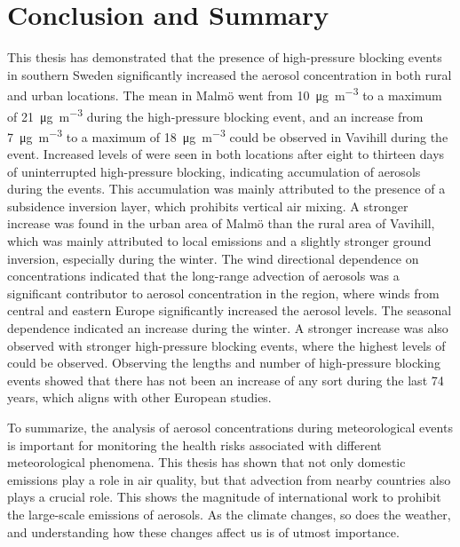 \newpage
\section{Conclusion and Summary}
This thesis has demonstrated that the presence of high-pressure blocking events in southern Sweden significantly increased the aerosol concentration in both rural and urban locations. The mean \PM in Malmö went from \SI{10}{\micro\gram\per\meter\cubed} to a maximum of \SI{21}{\micro\gram\per\meter\cubed} during the high-pressure blocking event, and an increase from \SI{7}{\micro\gram\per\meter\cubed} to a maximum of \SI{18}{\micro\gram\per\meter\cubed} could be observed in Vavihill during the event. Increased levels of \PM were seen in both locations after eight to thirteen days of uninterrupted high-pressure blocking, indicating accumulation of aerosols during the events. This accumulation was mainly attributed to the presence of a subsidence inversion layer, which prohibits vertical air mixing. A stronger increase was found in the urban area of Malmö than the rural area of Vavihill, which was mainly attributed to local emissions and a slightly stronger ground inversion, especially during the winter. The wind directional dependence on \PM concentrations indicated that the long-range advection of aerosols was a significant contributor to aerosol concentration in the region, where winds from central and eastern Europe significantly increased the aerosol levels. The seasonal dependence indicated an increase during the winter. A stronger increase was also observed with stronger high-pressure blocking events, where the highest levels of \PM could be observed. Observing the lengths and number of high-pressure blocking events showed that there has not been an increase of any sort during the last 74 years, which aligns with other European studies.

To summarize, the analysis of aerosol concentrations during meteorological events is important for monitoring the health risks associated with different meteorological phenomena. This thesis has shown that not only domestic emissions play a role in air quality, but that advection from nearby countries also plays a crucial role. This shows the magnitude of international work to prohibit the large-scale emissions of aerosols. As the climate changes, so does the weather, and understanding how these changes affect us is of utmost importance. 

